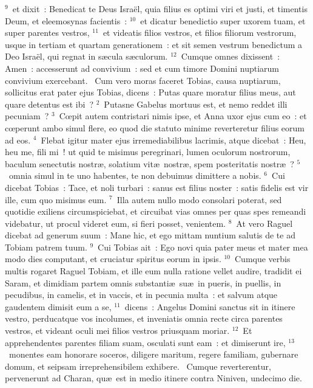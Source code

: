 ${}^{9}$~et dixit~: Benedicat te Deus Isra\"el, quia filius es optimi viri et justi, et timentis Deum, et eleemosynas facientis~:
${}^{10}$~et dicatur benedictio super uxorem tuam, et super parentes vestros,
${}^{11}$~et videatis filios vestros, et filios filiorum vestrorum, usque in tertiam et quartam generationem~: et sit semen vestrum benedictum a Deo Isra\"el, qui regnat in s\ae cula s\ae culorum.
${}^{12}$~Cumque omnes dixissent~: Amen~: accesserunt ad convivium~: sed et cum timore Domini nuptiarum convivium exercebant.
~Cum vero moras faceret Tobias, causa nuptiarum, sollicitus erat pater ejus Tobias, dicens~: Putas quare moratur filius meus, aut quare detentus est ibi~?
${}^{2}$~Putasne Gabelus mortuus est, et nemo reddet illi pecuniam~?
${}^{3}$~Cœpit autem contristari nimis ipse, et Anna uxor ejus cum eo~: et cœperunt ambo simul flere, eo quod die statuto minime reverteretur filius eorum ad eos.
${}^{4}$~Flebat igitur mater ejus irremediabilibus lacrimis, atque dicebat~: Heu, heu me, fili mi~! ut quid te misimus peregrinari, lumen oculorum nostrorum, baculum senectutis nostr\ae , solatium vit\ae\ nostr\ae , spem posteritatis nostr\ae~?
${}^{5}$~omnia simul in te uno habentes, te non debuimus dimittere a nobis.
${}^{6}$~Cui dicebat Tobias~: Tace, et noli turbari~: sanus est filius noster~: satis fidelis est vir ille, cum quo misimus eum.
${}^{7}$~Illa autem nullo modo consolari poterat, sed quotidie exiliens circumspiciebat, et circuibat vias omnes per quas spes remeandi videbatur, ut procul videret eum, si fieri posset, venientem.
${}^{8}$~At vero Raguel dicebat ad generum suum~: Mane hic, et ego mittam nuntium salutis de te ad Tobiam patrem tuum.
${}^{9}$~Cui Tobias ait~: Ego novi quia pater meus et mater mea modo dies computant, et cruciatur spiritus eorum in ipsis.
${}^{10}$~Cumque verbis multis rogaret Raguel Tobiam, et ille eum nulla ratione vellet audire, tradidit ei Saram, et dimidiam partem omnis substanti\ae\ su\ae\ in pueris, in puellis, in pecudibus, in camelis, et in vaccis, et in pecunia multa~: et salvum atque gaudentem dimisit eum a se,
${}^{11}$~dicens~: Angelus Domini sanctus sit in itinere vestro, perducatque vos incolumes, et inveniatis omnia recte circa parentes vestros, et videant oculi mei filios vestros priusquam moriar.
${}^{12}$~Et apprehendentes parentes filiam suam, osculati sunt eam~: et dimiserunt ire,
${}^{13}$~monentes eam honorare soceros, diligere maritum, regere familiam, gubernare domum, et seipsam irreprehensibilem exhibere.
~Cumque reverterentur, pervenerunt ad Charan, qu\ae\ est in medio itinere contra Niniven, undecimo die.
